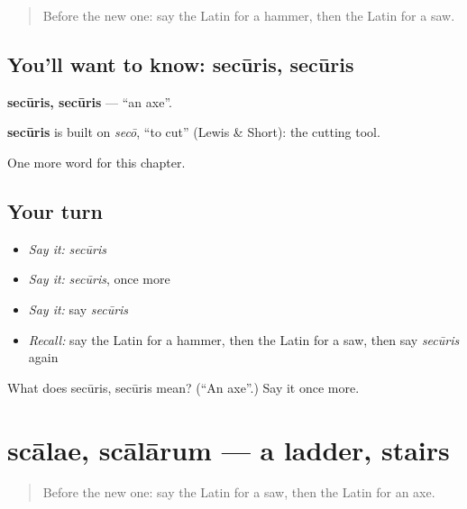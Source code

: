 \label{lesson:LA-C122-securis}



\begin{quote}
Before the new one: say the Latin for a hammer, then the Latin for a saw.
\end{quote}

\subsection*{You'll want to know: secūris, secūris}
\textbf{secūris, secūris} — \textquotedblleft{}an axe\textquotedblright{}.

\begin{cousinweb}
\textbf{secūris} is built on \emph{secō}, \textquotedblleft{}to cut\textquotedblright{} (Lewis \& Short): the cutting tool.
\end{cousinweb}

\begin{grammarlens}[title={What you've built}]
One more word for this chapter.
\end{grammarlens}

\subsection*{Your turn}
\begin{itemize}
\raggedright
  \item \emph{Say it:} \emph{secūris}
  \item \emph{Say it:} \emph{secūris}, once more
  \item \emph{Say it:} say \emph{secūris}
  \item \emph{Recall:} say the Latin for a hammer, then the Latin for a saw, then say \emph{secūris} again
\end{itemize}

\begin{tcolorbox}[breakable,colback=teal!4,colframe=teal!35!black,title={Before you move on}]
What does secūris, secūris mean? (\textquotedblleft{}An axe\textquotedblright{}.) Say it once more.
\end{tcolorbox}
\section[scālae, scālārum]{scālae, scālārum — a ladder, stairs}

\label{lesson:LA-C122-scalae}



\begin{quote}
Before the new one: say the Latin for a saw, then the Latin for an axe.
\end{quote}

